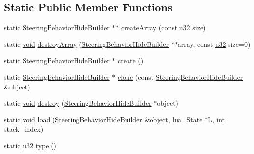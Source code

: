 \subsection*{Static Public Member Functions}
\begin{DoxyCompactItemize}
\item 
static \mbox{\hyperlink{classnjli_1_1_steering_behavior_hide_builder}{Steering\+Behavior\+Hide\+Builder}} $\ast$$\ast$ \mbox{\hyperlink{classnjli_1_1_steering_behavior_hide_builder_a4d39b1c0a0217217ab35f8d12c476595}{create\+Array}} (const \mbox{\hyperlink{_util_8h_a10e94b422ef0c20dcdec20d31a1f5049}{u32}} size)
\item 
static \mbox{\hyperlink{_thread_8h_af1e856da2e658414cb2456cb6f7ebc66}{void}} \mbox{\hyperlink{classnjli_1_1_steering_behavior_hide_builder_a123b26cb4024dab53211d3b463ada206}{destroy\+Array}} (\mbox{\hyperlink{classnjli_1_1_steering_behavior_hide_builder}{Steering\+Behavior\+Hide\+Builder}} $\ast$$\ast$array, const \mbox{\hyperlink{_util_8h_a10e94b422ef0c20dcdec20d31a1f5049}{u32}} size=0)
\item 
static \mbox{\hyperlink{classnjli_1_1_steering_behavior_hide_builder}{Steering\+Behavior\+Hide\+Builder}} $\ast$ \mbox{\hyperlink{classnjli_1_1_steering_behavior_hide_builder_a33a4c0e42677f40bc2bc670f73991f46}{create}} ()
\item 
static \mbox{\hyperlink{classnjli_1_1_steering_behavior_hide_builder}{Steering\+Behavior\+Hide\+Builder}} $\ast$ \mbox{\hyperlink{classnjli_1_1_steering_behavior_hide_builder_ac579b37c08f1ca2cbac9f4f7215b05aa}{clone}} (const \mbox{\hyperlink{classnjli_1_1_steering_behavior_hide_builder}{Steering\+Behavior\+Hide\+Builder}} \&object)
\item 
static \mbox{\hyperlink{_thread_8h_af1e856da2e658414cb2456cb6f7ebc66}{void}} \mbox{\hyperlink{classnjli_1_1_steering_behavior_hide_builder_a09a39860185eaed59b62223ff8fc7393}{destroy}} (\mbox{\hyperlink{classnjli_1_1_steering_behavior_hide_builder}{Steering\+Behavior\+Hide\+Builder}} $\ast$object)
\item 
static \mbox{\hyperlink{_thread_8h_af1e856da2e658414cb2456cb6f7ebc66}{void}} \mbox{\hyperlink{classnjli_1_1_steering_behavior_hide_builder_a5b64fbc1b6b0182ae7a2d27983315e66}{load}} (\mbox{\hyperlink{classnjli_1_1_steering_behavior_hide_builder}{Steering\+Behavior\+Hide\+Builder}} \&object, lua\+\_\+\+State $\ast$L, int stack\+\_\+index)
\item 
static \mbox{\hyperlink{_util_8h_a10e94b422ef0c20dcdec20d31a1f5049}{u32}} \mbox{\hyperlink{classnjli_1_1_steering_behavior_hide_builder_a38a9fc01053815da006adef42faec3f4}{type}} ()
\end{DoxyCompactItemize}
